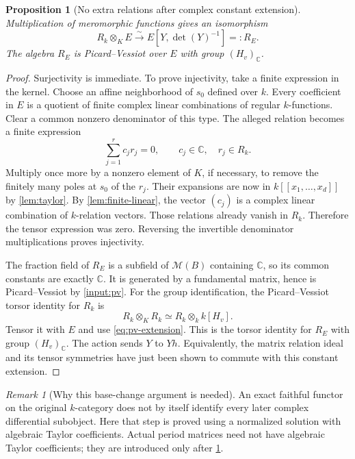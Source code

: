 \documentclass[11pt]{article}
\numberwithin{equation}{section}
\newtheorem{proposition}[proposition]{Proposition}
\theoremstyle{definition}
\theoremstyle{remark}
\newtheorem{remark}[remark]{Remark}
\newcommand{\C}{\mathbb C}
\begin{document}
\begin{proposition}[No extra relations after complex constant extension]\label{prop:pv-base-change}
Multiplication of meromorphic functions gives an isomorphism
\begin{equation}\label{eq:pv-extension}
 R_k\otimes_K E\xrightarrow{\sim}
 E[Y,\det(Y)^{-1}]=:R_E.
\end{equation}
The algebra $R_E$ is Picard--Vessiot over $E$ with group $(H_v)_\C$.
\end{proposition}
\begin{proof}
Surjectivity is immediate. To prove injectivity, take a finite expression
in the kernel. Choose an affine neighborhood of $s_0$ defined over $k$.
Every coefficient in $E$ is a quotient of finite complex linear
combinations of regular $k$-functions. Clear a common nonzero denominator
of this type. The alleged relation becomes a finite expression
\[
 \sum_{j=1}^r c_j r_j=0,\qquad c_j\in\C,\quad r_j\in R_k.
\]
Multiply once more by a nonzero element of $K$, if necessary, to remove
the finitely many poles at $s_0$ of the $r_j$. Their expansions are now in
$k[[x_1,\ldots,x_d]]$ by \cref{lem:taylor}. By
\cref{lem:finite-linear}, the vector $(c_j)$ is a complex linear
combination of $k$-relation vectors. Those relations already vanish in
$R_k$. Therefore the tensor expression was zero. Reversing the invertible
denominator multiplications proves injectivity.

The fraction field of $R_E$ is a subfield of $\mathscr M(B)$ containing
$\C$, so its common constants are exactly $\C$. It is generated by a
fundamental matrix, hence is Picard--Vessiot by \cref{input:pv}.
For the group identification, the Picard--Vessiot torsor identity for
$R_k$ is
\[
 R_k\otimes_K R_k\simeq R_k\otimes_k k[H_v].
\]
Tensor it with $E$ and use \eqref{eq:pv-extension}. This is the torsor
identity for $R_E$ with group $(H_v)_\C$. The action sends $Y$ to $Yh$.
Equivalently, the matrix relation ideal and its tensor symmetries have
just been shown to commute with this constant extension.
\end{proof}

\begin{remark}[Why this base-change argument is needed]
An exact faithful functor on the original $k$-category does not by itself
identify every later complex differential subobject. Here that step is
proved using a normalized solution with algebraic Taylor coefficients.
Actual period matrices need not have algebraic Taylor coefficients; they
are introduced only after \cref{prop:pv-base-change}.
\end{remark}
\end{document}
